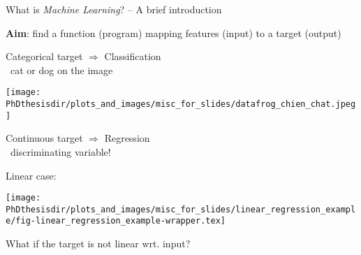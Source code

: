 \begin{frame}{What is \emph{Machine Learning}? -- A brief introduction}

\begin{center}
\textbf{Aim}: find a function (program) mapping features (input) to a target (output)
\end{center}

\pause
\begin{minipage}[t]{.45\textwidth}
\manip Categorical target $\Rightarrow$ Classification\\
\qquad\eg\ cat or dog on the image
\begin{center}
\texttt{[image: \\PhDthesisdir/plots\_and\_images/misc\_for\_slides/datafrog\_chien\_chat.jpeg]}
\end{center}
\end{minipage}
\hfill\pause
\begin{minipage}[t]{.45\textwidth}
\manip Continuous target $\Rightarrow$ Regression\\
\qquad\eg\ discriminating variable!

Linear case:
\begin{center}
\texttt{[image: \\PhDthesisdir/plots\_and\_images/misc\_for\_slides/linear\_regression\_example/fig-linear\_regression\_example-wrapper.tex]}
\end{center}

What if the target is not linear wrt. input?
\end{minipage}

\end{frame}